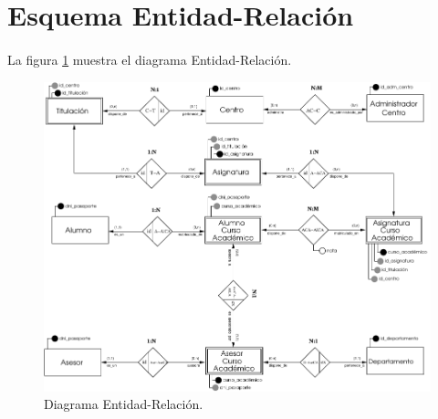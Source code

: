 \newpage

\section{Esquema Entidad-Relación}

   \paragraph{}La figura \ref{diagramaER} muestra el diagrama Entidad-Relación.

   \begin{figure}[!ht]
            \begin{center}
            \includegraphics[]{07.Modelo_Entidad-Interrelacion/7.4.Esquema_E-R/diagramaER.pdf}
            \caption{Diagrama Entidad-Relación.}
            \label{diagramaER}
            \end{center}
         \end{figure}